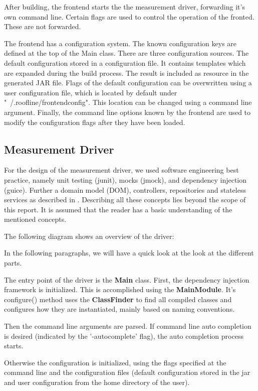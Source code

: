 \documentclass[a4paper,12pt]{article}
\newlength{\imgwidth}
\newcommand{\umlDiagram}[1]{%
	\settowidth{\imgwidth}{\texttt{[image: out/diagrams/\#1.pdf]}}%
	\setlength{\imgwidth}{\minof{0.5\imgwidth}{\textwidth}}%
	\par\vskip0.5cm\noindent\makebox[\textwidth][c]{%
	\texttt{[image: out/diagrams/\#1.pdf]}%
}\vskip0.5cm}
\newcommand{\class}[1]{\textbf{#1}}
\newcommand{\method}[1]{\textsf{#1}}
\begin{document}
After building, the frontend starts the the measurement driver, forwarding it's
own command line. Certain flags are used to control the operation of the
fronted. These are not forwarded.

The frontend has a configuration system. The known configuration keys are
defined at the top of the Main class. There are three configuration sources. The
default configuration stored in a configuration file. It contains templates
which are expanded during the build process. The result is included as resource
in the generated JAR file. Flags of the default configuration can be overwritten
using a user configuration file, which is located by default under
"~/.roofline/frontendconfig". This location can be changed using a command line
argument. Finally, the command line options known by the frontend are used to
modify the configuration flags after they have been loaded. 

\subsection{Measurement Driver}
For the design of the measurement driver, we used software engineering best
practice, namely unit testing (junit), mocks (jmock), and dependency
injection (guice). Further a domain model (DOM), controllers, repositories and
stateless services as described in \cite{evans2004domain}.
Describing all these concepts lies beyond the scope of this report. It is
assumed that the reader has a basic understanding of the mentioned concepts.

The following diagram shows an overview of the driver:

\umlDiagram{measurementDriver/MeasurementDriverOverview}

In the following paragraphs, we will have a quick look at the look at the
different parts. 

The entry point of the driver is the \class{Main} class. First, the dependency
injection framework is initialized. This is accomplished using the
\class{MainModule}. It's \method{configure()} method uses the
\class{ClassFinder} to find all compiled classes and configures how they are
instantiated, mainly based on naming conventions.

Then the command line arguments are parsed. If command line auto completion is
desired (indicated by the '-autocomplete' flag), the auto completion process
starts. 

Otherwise the configuration is initialized, using the flags specified at the
command line and the configuration files (default configuration stored in the
jar and user configuration from the home directory of the user).
\end{document}
